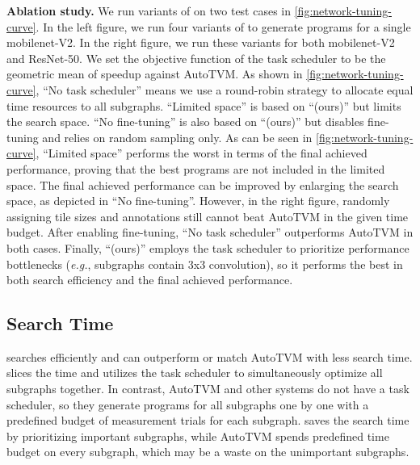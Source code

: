 \textbf{Ablation study.} We run variants of \Ansor on two test cases in \autoref{fig:network-tuning-curve}. In the left figure, we run four variants of \Ansor to generate programs for a single mobilenet-V2. In the right figure, we run these variants for both mobilenet-V2 and ResNet-50.
We set the objective function of the task scheduler to be the geometric mean of speedup against AutoTVM.
As shown in \autoref{fig:network-tuning-curve}, ``No task scheduler'' means we use a round-robin strategy to allocate equal time resources to all subgraphs. ``Limited space'' is based on ``\Ansor (ours)'' but limits the search space. ``No fine-tuning'' is also based on ``\Ansor (ours)'' but disables fine-tuning and relies on random sampling only.
As can be seen in \autoref{fig:network-tuning-curve}, ``Limited space'' performs the worst in terms of the final achieved performance, proving that the best programs are not included in the limited space.
The final achieved performance can be improved by enlarging the search space, as depicted in ``No fine-tuning''.
However, in the right figure, randomly assigning tile sizes and annotations still cannot beat AutoTVM in the given time budget.
After enabling fine-tuning, ``No task scheduler'' outperforms AutoTVM in both cases.
Finally, ``\Ansor (ours)'' employs the task scheduler to prioritize performance bottlenecks (\textit{e.g.}, subgraphs contain 3x3 convolution), so it performs the best in both search efficiency and the final achieved performance.




\subsection{Search Time}

\Ansor searches efficiently and can outperform or match AutoTVM with less search time.
\Ansor slices the time and utilizes the task scheduler to simultaneously optimize all subgraphs together.
In contrast, AutoTVM and other systems do not have a task scheduler, so they generate programs for all subgraphs one by one with a predefined budget of measurement trials for each subgraph.
\Ansor saves the search time by prioritizing important subgraphs, while AutoTVM spends predefined time budget on every subgraph, which may be a waste on the unimportant subgraphs.

